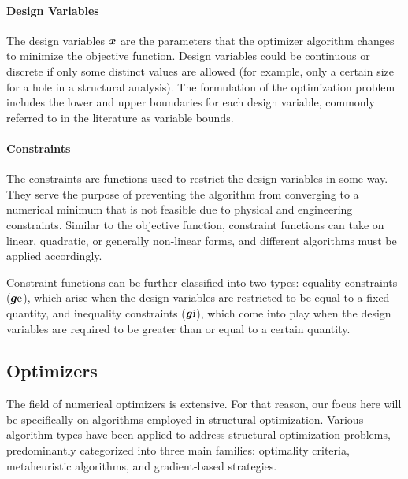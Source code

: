 \paragraph{Design Variables}
The design variables $\bm{x}$ are the parameters that the optimizer algorithm changes to minimize the objective function. Design variables could be continuous or discrete if only some distinct values are allowed (for example, only a certain size for a hole in a structural analysis). The formulation of the optimization problem includes the lower and upper boundaries for each design variable, commonly referred to in the literature as variable bounds.

\paragraph{Constraints}
The constraints are functions used to restrict the design variables in some way. They serve the purpose of preventing the algorithm from converging to a numerical minimum that is not feasible due to physical and engineering constraints. Similar to the objective function, constraint functions can take on linear, quadratic, or generally non-linear forms, and different algorithms must be applied accordingly.

Constraint functions can be further classified into two types: equality constraints ($\bm{g}\text{e}$), which arise when the design variables are restricted to be equal to a fixed quantity, and inequality constraints ($\bm{g}\text{i}$), which come into play when the design variables are required to be greater than or equal to a certain quantity.

\subsection{Optimizers}
The field of numerical optimizers is extensive. For that reason, our focus here will be specifically on algorithms employed in structural optimization. Various algorithm types have been applied to address structural optimization problems, predominantly categorized into three main families: optimality criteria, metaheuristic algorithms, and gradient-based strategies.

